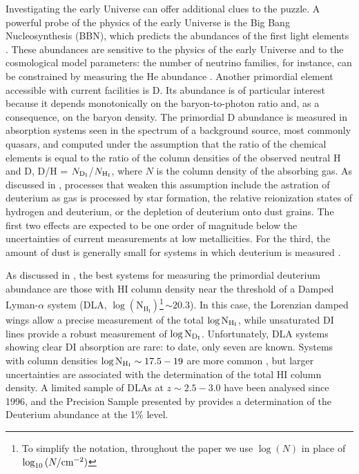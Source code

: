 \documentclass[fleqn,usenatbib]{mnras}
\makeatletter
\DeclareRobustCommand{\ion}[2]{%
  \mbox{#1\check@mathfonts\fontsize\sf@size\z@\selectfont #2}%
}
\makeatother
\begin{document}
Investigating the early Universe can offer additional clues to the puzzle. A powerful probe of the physics of the early Universe is the Big Bang Nucleosynthesis (BBN), which predicts the abundances of the first light elements \citep[\ion{H}{}, \ion{D}{}, $^3$\ion{He}{}, $^4$\ion{He}{}, $^7$\ion{Li}{}. For a general review on the Big Bang Nucleosynthesis, see e.g.,][chapter 24 (Fields, Molaro, Sarkar)]{BBN_1, BBN_3, BBN_2, BBN_4}. These abundances are sensitive to the physics of the early Universe and to the cosmological model parameters: the number of neutrino families, for instance, can be constrained by measuring the He abundance \citep[see, e.g.,][]{peimber_He_neutrinos}. Another primordial element accessible with current facilities is D. Its abundance is of particular interest because it depends monotonically on the baryon-to-photon ratio and, as a consequence, on the baryon density. The primordial D abundance is measured in absorption systems seen in the spectrum of a background source, most commonly quasars, and computed under the assumption that the ratio of the chemical elements is equal to the ratio of the column densities of the observed neutral H and D, D/H = $N_{\rm D_I}$/$N_{\rm H_I}$, where $N$ is the column density of the absorbing gas. As discussed in \citet[and references therein]{cooke_18}, processes that weaken this assumption include the astration of deuterium as gas is processed by star formation, the relative reionization states of hydrogen and deuterium, or the depletion of deuterium onto dust grains. The first two effects are expected to be one order of magnitude below the uncertainties of current measurements at low metallicities. For the third, the amount of dust is generally small for systems in which deuterium is measured \citep{BBN_4}. 

As discussed in \citet{cooke_14, cooke_18}, the best systems for measuring the primordial deuterium abundance are those with \ion{H}{I} column density near the threshold of a Damped Lyman-$\alpha$ system (DLA, $\log(\mathrm{N_{H_I}})$\footnote{To simplify the notation, throughout the paper we use $\log{(N)}$ in place of $\log_{10}{(N/{\rm cm^{-2}}})$}\,$ \sim 20.3$). In this case, the Lorenzian damped wings allow a precise measurement of the total $\log{\rm N_{H_I}}$, while unsaturated \ion{D}{I} lines provide a robust measurement of $\log{\rm N_{D_I}}$.  
Unfortunately, DLA systems showing clear \ion{D}{I} absorption are rare: to date, only seven are known. Systems with column densities $\log{\rm N_{H_I}}\sim 17.5-19$ are more common \citep[][hereafter RS17]{RS_17}, but larger uncertainties are associated with the determination of the total \ion{H}{I} column density. A limited sample of DLAs at $z\sim2.5-3.0$ have been analysed since 1996, and the Precision Sample presented by \citet{cooke_18} provides a determination of the Deuterium abundance at the 1\% level.
\end{document}
